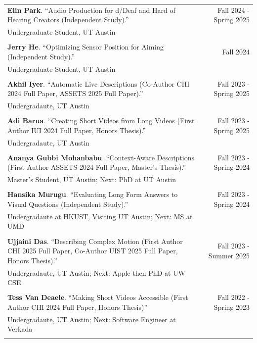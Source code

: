 \begin{longtable}{Xr}
	\textbf{Elin Park}. ``Audio Production for d/Deaf and Hard of Hearing Creators (Independent Study).'' & Fall 2024 - Spring 2025 \\
	Undergraduate Student, UT Austin &  \\
	\\

	\textbf{Jerry He}. ``Optimizing Sensor Position for Aiming (Independent Study).'' & Fall 2024 \\
	Undergraduate Student, UT Austin &  \\
	\\

	\textbf{Akhil Iyer}. ``Automatic Live Descriptions (Co-Author CHI 2024 Full Paper, ASSETS 2025 Full Paper).'' & Fall 2023 - Spring 2025 \\
	Undergradaute, UT Austin &  \\
	\\

	\textbf{Adi Barua}. ``Creating Short Videos from Long Videos (First Author IUI 2024 Full Paper, Honors Thesis).'' & Fall 2023 - Spring 2025 \\
	Undergradaute, UT Austin &  \\
	\\

	\textbf{Ananya Gubbi Mohanbabu}. ``Context-Aware Descriptions (First Author ASSETS 2024 Full Paper, Master's Thesis).'' & Fall 2023 - Spring 2024 \\
	Master's Student, UT Austin; Next: PhD at UT Austin &  \\
	\\

	\textbf{Hansika Murugu}. ``Evaluating Long Form Answers to Visual Questions (Independent Study).'' & Fall 2023 - Spring 2024 \\
	Undergradaute at HKUST, Visiting UT Austin; Next: MS at UMD &  \\
	\\

	\textbf{Ujjaini Das}. ``Describing Complex Motion (First Author CHI 2025 Full Paper, Co-Author UIST 2025 Full Paper, Honors Thesis).'' & Fall 2023 - Summer 2025 \\
	Undergradaute, UT Austin; Next: Apple then PhD at UW CSE &  \\
	\\

	\textbf{Tess Van Deaele}. ``Making Short Videos Accessible (First Author CHI 2024 Full Paper, Honors Thesis)'' & Fall 2022 - Spring 2023 \\
	Undergradaute, UT Austin; Next: Software Engineer at Verkada &  \\
	\\


\end{longtable}
